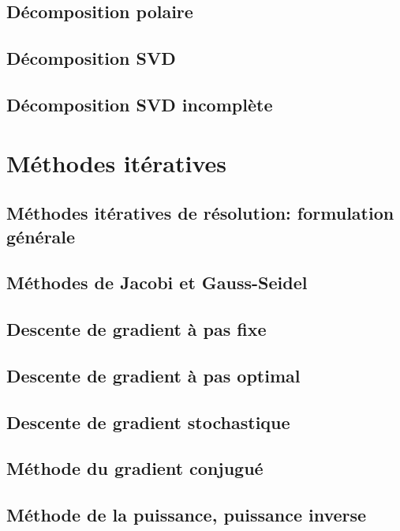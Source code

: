 \subsection{Décomposition polaire}

\subsection{Décomposition SVD}

\subsection{Décomposition SVD incomplète}


\section{Méthodes itératives}

\subsection{Méthodes itératives de résolution: formulation générale}

\subsection{Méthodes de Jacobi et Gauss-Seidel}

\subsection{Descente de gradient à pas fixe}

\subsection{Descente de gradient à pas optimal}

\subsection{Descente de gradient stochastique}

\subsection{Méthode du gradient conjugué}

\subsection{Méthode de la puissance, puissance inverse}

